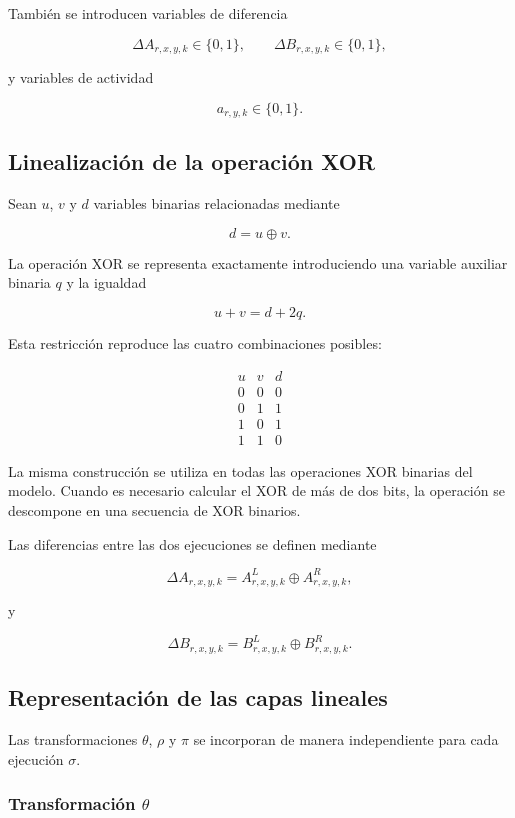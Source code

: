 También se introducen variables de diferencia

\[
\Delta A_{r,x,y,k} \in \{0,1\},
\qquad
\Delta B_{r,x,y,k} \in \{0,1\},
\]

y variables de actividad

\[
a_{r,y,k} \in \{0,1\}.
\]


\subsection{Linealización de la operación XOR}
\label{subsec:xor_milp}

Sean $u$, $v$ y $d$ variables binarias relacionadas mediante

\[
d = u \oplus v.
\]

La operación XOR se representa exactamente introduciendo una variable
auxiliar binaria $q$ y la igualdad

\[
u+v=d+2q.
\label{eq:xor_lineal}
\]

Esta restricción reproduce las cuatro combinaciones posibles:

\[
\begin{array}{c|c|c}
u & v & d\\
\hline
0 & 0 & 0\\
0 & 1 & 1\\
1 & 0 & 1\\
1 & 1 & 0
\end{array}
\]

La misma construcción se utiliza en todas las operaciones XOR binarias
del modelo. Cuando es necesario calcular el XOR de más de dos bits, la
operación se descompone en una secuencia de XOR binarios.

Las diferencias entre las dos ejecuciones se definen mediante

\[
\Delta A_{r,x,y,k}
=
A_{r,x,y,k}^{L}
\oplus
A_{r,x,y,k}^{R},
\]

y

\[
\Delta B_{r,x,y,k}
=
B_{r,x,y,k}^{L}
\oplus
B_{r,x,y,k}^{R}.
\]


\subsection{Representación de las capas lineales}
\label{subsec:capas_lineales_milp}

Las transformaciones $\theta$, $\rho$ y $\pi$ se incorporan de manera
independiente para cada ejecución $\sigma$.


\subsubsection{Transformación \texorpdfstring{$\theta$}{theta}}

